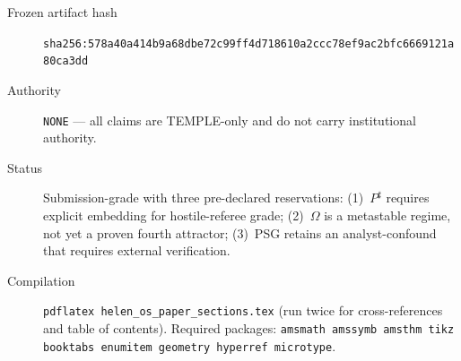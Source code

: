 \documentclass[12pt, a4paper]{article}
\theoremstyle{definition}
\theoremstyle{plain}
\theoremstyle{remark}
\begin{document}
\begin{description}
\item[Frozen artifact hash]
  \texttt{sha256:578a40a414b9a68dbe72c99ff4d718610a2ccc78ef9ac2bfc6669121a80ca3dd}
\item[Authority]
  \texttt{NONE} --- all claims are TEMPLE-only and do not carry
  institutional authority.
\item[Status]
  Submission-grade with three pre-declared reservations:
  (1)~$P^{\sharp}$ requires explicit embedding for hostile-referee grade;
  (2)~$\Omega$ is a metastable regime, not yet a proven fourth attractor;
  (3)~PSG retains an analyst-confound that requires external verification.
\item[Compilation]
  \texttt{pdflatex helen\_os\_paper\_sections.tex} (run twice for
  cross-references and table of contents).
  Required packages: \texttt{amsmath amssymb amsthm tikz booktabs
  enumitem geometry hyperref microtype}.
\end{description}

\end{document}
